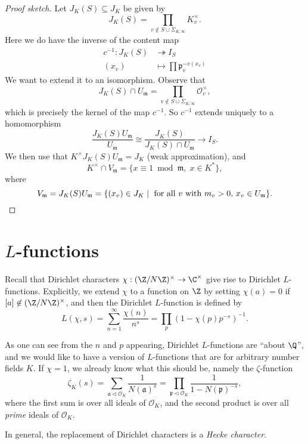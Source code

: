 \documentclass[a4paper]{article}
\begin{document}
\begin{proof}[Proof sketch]
  Let $J_K(S) \subseteq J_K$ be given by
  \[
    J_K(S) = \prod_{v \not\in S \cup \Sigma_{K, \infty}} K_v^\times.
  \]
  Here we do have the inverse of the content map
  \begin{align*}
    c^{-1}: J_K(S) &\twoheadrightarrow I_S\\
    (x_v) &\mapsto \prod \mathfrak{p}_v^{-v(x_v)}
  \end{align*}
  We want to extend it to an isomorphism. Observe that
  \[
    J_K(S) \cap U_\mathfrak{m} = \prod_{v \not \in S \cup \Sigma_{K, \infty}} \mathcal{O}_v^\times,
  \]
  which is precisely the kernel of the map $c^{-1}$. So $c^{-1}$ extends uniquely to a homomorphism
  \[
    \frac{J_K(S) U_\mathfrak{m}}{U_\mathfrak{m}} \cong \frac{J_K(S)}{J_K(S) \cap U_\mathfrak{m}} \to I_S.
  \]
  We then use that $K^\times J_K(S) U_\mathfrak{m} = J_K$ (weak approximation), and
  \[
    K^\times \cap V_\mathfrak{m} = \{x \equiv 1 \bmod{\mathfrak{m}},\; x \in K^*\},
  \]
  where
  \[
    V_\mathfrak{m} = J_K(S) U_\mathfrak{m} = \{(x_v)\in J_K \mid \text{ for all $v$ with $m_v > 0$, }x_v \in U_\mathfrak{m}\}.\qedhere
  \]
\end{proof}

\section{\texorpdfstring{$L$}{L}-functions}
Recall that Dirichlet characters $\chi: (\Z/N\Z)^\times \to \C^\times$ give rise to Dirichlet $L$-functions. Explicitly, we extend $\chi$ to a function on $\Z$ by setting $\chi(a) = 0$ if $[a] \not \in (\Z/N\Z)^\times$, and then the Dirichlet $L$-function is defined by
\[
  L(\chi, s) = \sum_{n = 1}^\infty \frac{\chi(n)}{n^s} = \prod_p (1 - \chi(p) p^{-s})^{-1}.
\]

As one can see from the $n$ and $p$ appearing, Dirichlet $L$-functions are ``about $\Q$'', and we would like to have a version of $L$-functions that are for arbitrary number fields $K$. If $\chi = 1$, we already know what this should be, namely the $\zeta$-function
\[
  \zeta_K(s) = \sum_{\mathfrak{a} \lhd \mathcal{O}_K} \frac{1}{N(\mathfrak{a})^s} = \prod_{\mathfrak{p} \lhd \mathcal{O}_K} \frac{1}{1 - N(\mathfrak{p})^{-s}},
\]
where the first sum is over all ideals of $\mathcal{O}_K$, and the second product is over all \emph{prime} ideals of $\mathcal{O}_K$.

In general, the replacement of Dirichlet characters is a \emph{Hecke character}.
\end{document}
